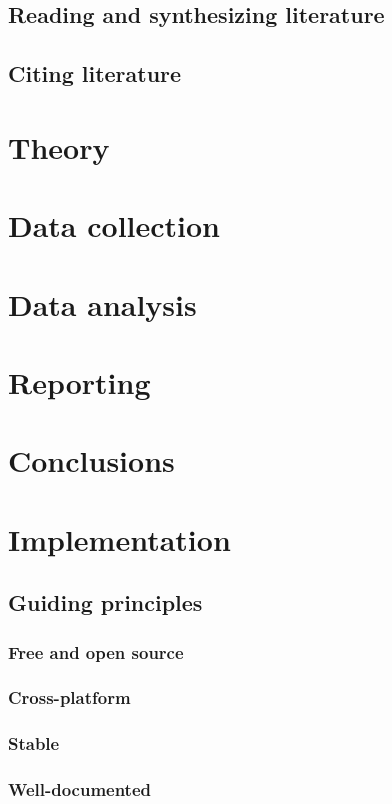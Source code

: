 \documentclass{book}
\begin{document}
\section{Reading and synthesizing literature}
\label{sec-4-3}
\section{Citing literature}
\label{sec-4-4}
\chapter{Theory}
\label{sec-5}
\label{theory}
\chapter{Data collection}
\label{sec-6}
\label{collection}
\chapter{Data analysis}
\label{sec-7}
\label{analysis}
\chapter{Reporting}
\label{sec-8}
\label{reporting}
\chapter{Conclusions}
\label{sec-9}
\label{conclusions}
\chapter{Implementation}
\label{sec-10}
\section{Guiding principles}
\label{sec-10-1}
\subsection{Free and open source}
\label{sec-10-1-1}
\subsection{Cross-platform}
\label{sec-10-1-2}
\subsection{Stable}
\label{sec-10-1-3}
\subsection{Well-documented}
\label{sec-10-1-4}
\end{document}
